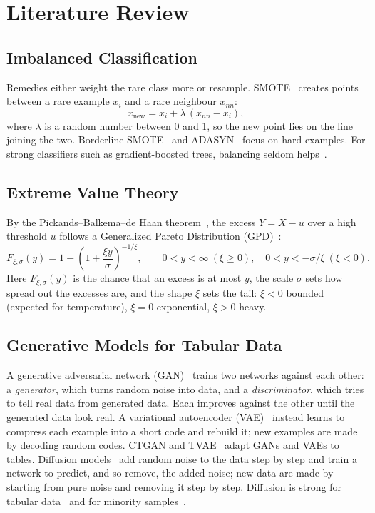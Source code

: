 \documentclass[12pt,a4paper]{report}
\begin{document}
\chapter{Literature Review}
\section{Imbalanced Classification}
Remedies either weight the rare class more or resample. SMOTE~\cite{chawla2002smote} creates points between a rare
example $x_i$ and a rare neighbour $x_{nn}$:
\begin{equation}
  x_{\text{new}} = x_i + \lambda\,(x_{nn}-x_i),
\end{equation}
where $\lambda$ is a random number between 0 and 1, so the new point lies on the line joining the two.
Borderline-SMOTE~\cite{han2005borderline} and ADASYN~\cite{he2008adasyn} focus on hard examples. For strong
classifiers such as gradient-boosted trees, balancing seldom helps~\cite{elor2022smote}.

\section{Extreme Value Theory}
By the Pickands--Balkema--de Haan theorem~\cite{pickands1975,balkema1974}, the excess $Y=X-u$ over a high threshold $u$
follows a Generalized Pareto Distribution (GPD)~\cite{coles2001}:
\begin{equation}
  F_{\xi,\sigma}(y)=1-\left(1+\frac{\xi y}{\sigma}\right)^{-1/\xi},\qquad 0<y<\infty\ (\xi\ge0),\quad 0<y<-\sigma/\xi\ (\xi<0) .
  \label{eq:gpd}
\end{equation}
Here $F_{\xi,\sigma}(y)$ is the chance that an excess is at most $y$, the scale $\sigma$ sets how spread out the excesses are, and the shape $\xi$ sets the tail: $\xi<0$ bounded (expected for temperature), $\xi=0$ exponential, $\xi>0$ heavy.

\section{Generative Models for Tabular Data}
A generative adversarial network (GAN)~\cite{goodfellow2014gan} trains two networks against each other: a
\emph{generator}, which turns random noise into data, and a \emph{discriminator}, which tries to tell real data from
generated data. Each improves against the other until the generated data look real. A variational autoencoder
(VAE)~\cite{kingma2014vae} instead learns to compress each example into a short code and rebuild it; new examples are
made by decoding random codes. CTGAN and TVAE~\cite{xu2019ctgan} adapt GANs and VAEs to tables. Diffusion
models~\cite{ho2020ddpm} add random noise to the data step by step and train a network to predict, and so remove, the
added noise; new data are made by starting from pure noise and removing it step by step.
Diffusion is strong for tabular data~\cite{kotelnikov2023tabddpm} and for minority samples~\cite{dsouza2025overlap}.
\end{document}
